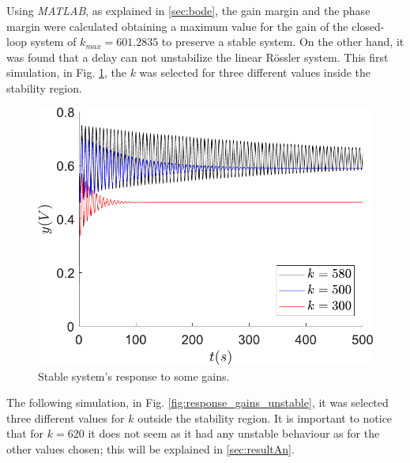Using \textit{MATLAB}, as explained in \ref{sec:bode}, the gain margin and the phase margin were calculated obtaining a maximum value for the gain of the closed-loop system of $k_{max} = 601.2835$ to preserve a stable system. On the other hand, it was found that a delay can not unstabilize the linear Rössler system. This first simulation, in Fig. \ref{fig:response_gains_k}, the $k$ was selected for three different values inside the stability region.

\begin{figure}[ht]
    \centering
    \includegraphics[scale=0.5]{figs/sineOutput/Lazo_cerrado_estable.pdf}
    \caption{Stable system's response to some gains.}
    \label{fig:response_gains_k}
\end{figure}

The following simulation, in Fig. \ref{fig:response_gains_unstable}, it was selected three different values for $k$ outside the stability region. It is important to notice that for $k=620$ it does not seem as it had any unstable behaviour as for the other values chosen; this will be explained in \ref{sec:resultAn}.


